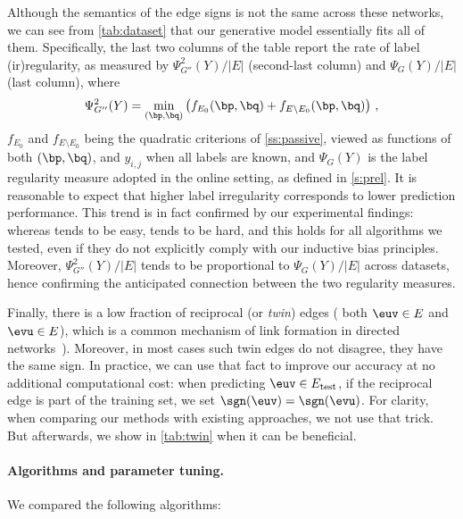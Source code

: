 Although the semantics of the edge signs is not the same across these networks, we can see from
\autoref{tab:dataset} that our generative model essentially fits all of them. Specifically, the last
two columns of the table report the rate of label (ir)regularity, as measured by
$\Psi^2_{G''}(Y)/|E|$ (second-last column) and $\Psi_{G}(Y)/|E|$ (last column), where 
\[
\Psi^2_{G''}(Y) = \min_{(\bp,\bq)} \left(f_{E_0}(\bp,\bq) + f_{E\setminus E_0}(\bp,\bq)\right)\,,
\]
$f_{E_0}$ and $f_{E\setminus E_0}$ being the quadratic criterions of \autoref{ss:passive}, viewed as
functions of both $(\bp,\bq)$, and $y_{i,j}$ when all labels are known, and $\Psi_{G}(Y)$ is the
label regularity measure adopted in the online setting, as defined in \autoref{s:prel}. It is
reasonable to expect that higher label irregularity corresponds to lower prediction performance.
This trend is in fact confirmed by our experimental findings: whereas \epi{} tends to be easy,
\aut{} tends to be hard, and this holds for all algorithms we tested, even if they do not explicitly
comply with our inductive bias principles. Moreover, $\Psi^2_{G''}(Y)/|E|$ tends to be proportional
to $\Psi_{G}(Y)/|E|$ across datasets, hence confirming the anticipated connection between the two
regularity measures.

\begin{newcontent}
Finally, there is a low fraction of reciprocal (or \emph{twin}) edges (\ie{} both $\euv \in E$ and $\evu
\in E$), which is a common mechanism of link formation in directed
networks~\autocites{DirectedReciprocity04}{Reciprocity13}). Moreover, in most cases such twin edges do not disagree,
\ie{} they have the same sign. In practice, we can use that fact to improve our accuracy at no
additional computational cost: when predicting $\euv \in E_{\mathrm{test}}$, if the reciprocal edge
\evu{} is part of the training set, we set $\sgn(\euv) = \sgn(\evu)$. For clarity, when comparing
our methods with existing approaches, we not use that trick. But afterwards, we show in
\autoref{tab:twin} when it can be beneficial.
\end{newcontent}

\paragraph{Algorithms and parameter tuning.} 
We compared the following algorithms:


